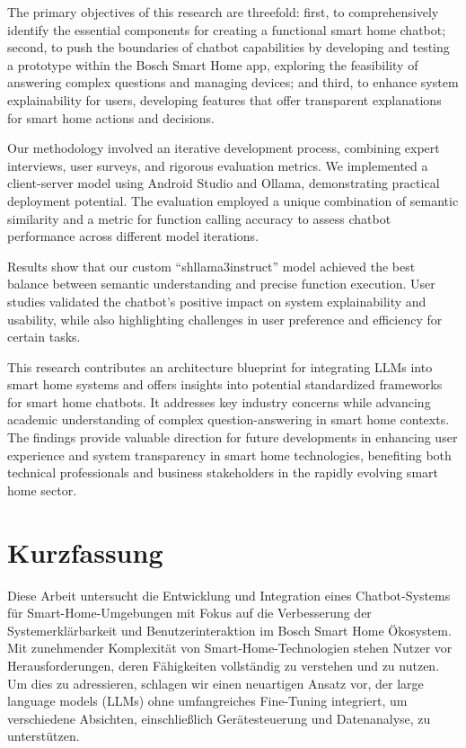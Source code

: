 \documentclass[
  a4paper,  %
  twoside,  %
  bibliography=totoc,
  headsepline,
  cleardoublepage=empty,
  parskip=half,
  draft=false
]{scrbook}
\begin{document}
The primary objectives of this research are threefold: first, to comprehensively identify the essential components for creating a functional smart home chatbot; second, to push the boundaries of chatbot capabilities by developing and testing a prototype within the Bosch Smart Home app, exploring the feasibility of answering complex questions and managing devices; and third, to enhance system explainability for users, developing features that offer transparent explanations for smart home actions and decisions.

Our methodology involved an iterative development process, combining expert interviews, user surveys, and rigorous evaluation metrics. We implemented a client-server model using Android Studio and Ollama, demonstrating practical deployment potential. The evaluation employed a unique combination of semantic similarity and a metric for function calling accuracy to assess chatbot performance across different model iterations.

Results show that our custom ``shllama3instruct'' model achieved the best balance between semantic understanding and precise function execution. User studies validated the chatbot's positive impact on system explainability and usability, while also highlighting challenges in user preference and efficiency for certain tasks.

This research contributes an architecture blueprint for integrating LLMs into smart home systems and offers insights into potential standardized frameworks for smart home chatbots. It addresses key industry concerns while advancing academic understanding of complex question-answering in smart home contexts. The findings provide valuable direction for future developments in enhancing user experience and system transparency in smart home technologies, benefiting both technical professionals and business stakeholders in the rapidly evolving smart home sector.
\cleardoublepage

\section*{Kurzfassung}
Diese Arbeit untersucht die Entwicklung und Integration eines Chatbot-Systems für Smart-Home-Umgebungen mit Fokus auf die Verbesserung der Systemerklärbarkeit und Benutzerinteraktion im Bosch Smart Home Ökosystem. Mit zunehmender Komplexität von Smart-Home-Technologien stehen Nutzer vor Herausforderungen, deren Fähigkeiten vollständig zu verstehen und zu nutzen. Um dies zu adressieren, schlagen wir einen neuartigen Ansatz vor, der large language models (LLMs) ohne umfangreiches Fine-Tuning integriert, um verschiedene Absichten, einschließlich Gerätesteuerung und Datenanalyse, zu unterstützen.
\end{document}
